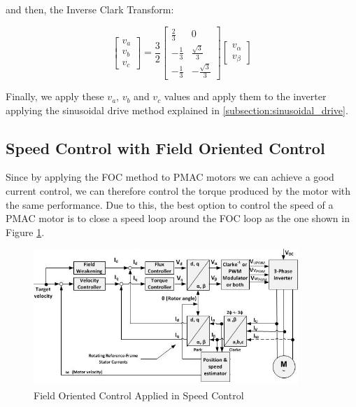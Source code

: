 and then, the Inverse Clark Transform:

\[
\begin{bmatrix}
v_{a}\\ 
v_{b}\\
v_{c}
\end{bmatrix}
=
\frac{3}{2}
\begin{bmatrix}
\frac{2}{3} & 0\\
-\frac{1}{3} & \frac{\sqrt{3}}{3}\\
-\frac{1}{3} & -\frac{\sqrt{3}}{3}
\end{bmatrix}
\begin{bmatrix}
v_{\alpha}\\
v_{\beta}
\end{bmatrix}
\]

Finally, we apply these  $v_{a}$, $v_{b}$ and $v_{c}$ values and apply them to the inverter applying the sinusoidal drive method explained in \ref{subsection:sinusoidal_drive}.

\subsection{Speed Control with Field Oriented Control}

Since by applying the \ac{FOC} method to \ac{PMAC} motors we can achieve a good current control, we can therefore control the torque produced by the motor with the same performance. Due to this, the best option to control the speed of a \ac{PMAC} motor is to close a speed loop around the \ac{FOC} loop as the one shown in Figure \ref{fig:foc_speed}.

\begin{figure}[htbp]
\centering
\includegraphics[width=10cm]{Images/foc_speed.png} 
\caption[Field Oriented Control applied in Speed Control]{Field Oriented Control Applied in Speed Control}
\label{fig:foc_speed}
\end{figure}